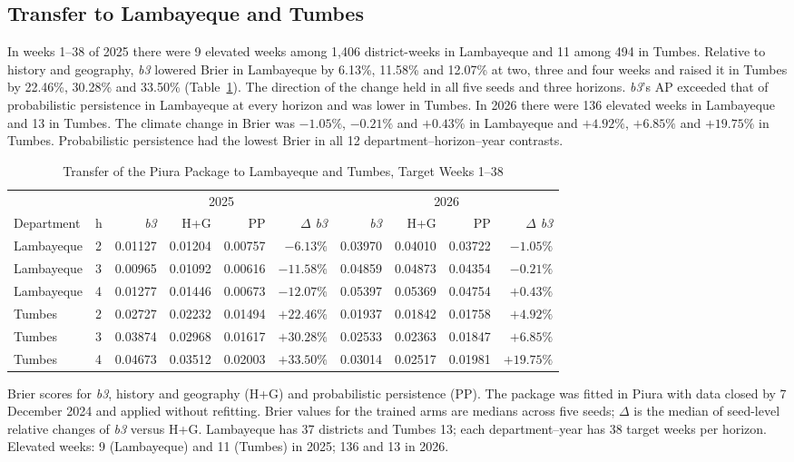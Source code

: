 \documentclass[journal]{IEEEtran}
\newcommand{\bthree}{\textit{b3}}
\begin{document}
\subsection{Transfer to Lambayeque and Tumbes}
In weeks 1--38 of 2025 there were 9 elevated weeks among 1,406 district-weeks in Lambayeque and 11 among 494 in Tumbes. Relative to history and geography, \bthree{} lowered Brier in Lambayeque by 6.13\%, 11.58\% and 12.07\% at two, three and four weeks and raised it in Tumbes by 22.46\%, 30.28\% and 33.50\% (Table~\ref{tab:transfer}). The direction of the change held in all five seeds and three horizons. \bthree{}'s AP exceeded that of probabilistic persistence in Lambayeque at every horizon and was lower in Tumbes. In 2026 there were 136 elevated weeks in Lambayeque and 13 in Tumbes. The climate change in Brier was $-1.05\%$, $-0.21\%$ and $+0.43\%$ in Lambayeque and $+4.92\%$, $+6.85\%$ and $+19.75\%$ in Tumbes. Probabilistic persistence had the lowest Brier in all 12 department--horizon--year contrasts.

\begin{table}[!t]
\caption{Transfer of the Piura Package to Lambayeque and Tumbes, Target Weeks 1--38}
\label{tab:transfer}
\centering
\begin{tabular}{@{}llrrrrrrrr@{}}
\toprule
 & & \multicolumn{4}{c}{2025} & \multicolumn{4}{c}{2026}\\
\cmidrule(lr){3-6}\cmidrule(l){7-10}
Department & h & \bthree{} & H+G & PP & $\Delta$ \bthree{} & \bthree{} & H+G & PP & $\Delta$ \bthree{}\\
\midrule
Lambayeque & 2 & 0.01127 & 0.01204 & 0.00757 & $-6.13\%$ & 0.03970 & 0.04010 & 0.03722 & $-1.05\%$\\
Lambayeque & 3 & 0.00965 & 0.01092 & 0.00616 & $-11.58\%$ & 0.04859 & 0.04873 & 0.04354 & $-0.21\%$\\
Lambayeque & 4 & 0.01277 & 0.01446 & 0.00673 & $-12.07\%$ & 0.05397 & 0.05369 & 0.04754 & $+0.43\%$\\
Tumbes & 2 & 0.02727 & 0.02232 & 0.01494 & $+22.46\%$ & 0.01937 & 0.01842 & 0.01758 & $+4.92\%$\\
Tumbes & 3 & 0.03874 & 0.02968 & 0.01617 & $+30.28\%$ & 0.02533 & 0.02363 & 0.01847 & $+6.85\%$\\
Tumbes & 4 & 0.04673 & 0.03512 & 0.02003 & $+33.50\%$ & 0.03014 & 0.02517 & 0.01981 & $+19.75\%$\\
\bottomrule
\end{tabular}

\vspace{2pt}\parbox{0.95\textwidth}{\footnotesize Brier scores for \bthree{}, history and geography (H+G) and probabilistic persistence (PP). The package was fitted in Piura with data closed by 7 December 2024 and applied without refitting. Brier values for the trained arms are medians across five seeds; $\Delta$ is the median of seed-level relative changes of \bthree{} versus H+G. Lambayeque has 37 districts and Tumbes 13; each department--year has 38 target weeks per horizon. Elevated weeks: 9 (Lambayeque) and 11 (Tumbes) in 2025; 136 and 13 in 2026.}
\end{table}
\end{document}
